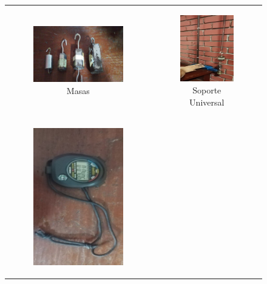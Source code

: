 \documentclass[../main.tex]{subfiles}
\begin{document}
\begin{figure}[H]
\begin{tabular}{c c}
    \begin{subfigure}{0.5\textwidth} 
        \centering
        \includegraphics[width=0.8\linewidth,height=0.6\linewidth]{resources/mat1.jpg}
        \caption{Masas}
        \label{fig:mat1}
    \end{subfigure}
    &
    \begin{subfigure}{0.5\textwidth} 
        \centering
        \includegraphics[width=0.8\linewidth,height=0.6\linewidth]{resources/mat2.png}
        \caption{Soporte Universal}
        \label{fig:mat2}
    \end{subfigure}
    \\
    \begin{subfigure}{0.5\textwidth} 
        \centering
        \includegraphics[width=0.8\linewidth,height=0.6\linewidth]{resources/mat3.jpg}

\end{subfigure}
\end{tabular}
\end{figure}
\end{document}
